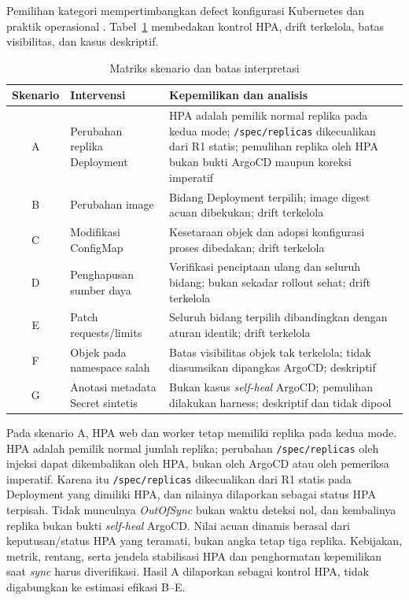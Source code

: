 Pemilihan kategori mempertimbangkan defect konfigurasi Kubernetes dan praktik operasional \citep{zhang2026configuration,pohjola2025mitigating}. Tabel~\ref{tab:matriks-eksperimen} membedakan kontrol HPA, drift terkelola, batas visibilitas, dan kasus deskriptif.

\begin{table}[H]
  \centering
  \small
  \caption{Matriks skenario dan batas interpretasi}
  \label{tab:matriks-eksperimen}
  \begin{tabularx}{\textwidth}{|c|>{\raggedright\arraybackslash}p{3.3cm}|X|}
    \hline
    Skenario & Intervensi & Kepemilikan dan analisis \\
    \hline
    A & Perubahan replika Deployment & HPA adalah pemilik normal replika pada kedua mode; \texttt{/spec/replicas} dikecualikan dari R1 statis; pemulihan replika oleh HPA bukan bukti ArgoCD maupun koreksi imperatif \\
    \hline
    B & Perubahan image & Bidang Deployment terpilih; image digest acuan dibekukan; drift terkelola \\
    \hline
    C & Modifikasi ConfigMap & Kesetaraan objek dan adopsi konfigurasi proses dibedakan; drift terkelola \\
    \hline
    D & Penghapusan sumber daya & Verifikasi penciptaan ulang dan seluruh bidang; bukan sekadar rollout sehat; drift terkelola \\
    \hline
    E & Patch requests/limits & Seluruh bidang terpilih dibandingkan dengan aturan identik; drift terkelola \\
    \hline
    F & Objek pada namespace salah & Batas visibilitas objek tak terkelola; tidak diasumsikan dipangkas ArgoCD; deskriptif \\
    \hline
    G & Anotasi metadata Secret sintetis & Bukan kasus \textit{self-heal} ArgoCD; pemulihan dilakukan harness; deskriptif dan tidak dipool \\
    \hline
  \end{tabularx}
\end{table}

Pada skenario A, HPA web dan worker tetap memiliki replika pada kedua mode. HPA adalah pemilik normal jumlah replika; perubahan \texttt{/spec/replicas} oleh injeksi dapat dikembalikan oleh HPA, bukan oleh ArgoCD atau oleh pemeriksa imperatif. Karena itu \texttt{/spec/replicas} dikecualikan dari R1 statis pada Deployment yang dimiliki HPA, dan nilainya dilaporkan sebagai status HPA terpisah. Tidak munculnya \textit{OutOfSync} bukan waktu deteksi nol, dan kembalinya replika bukan bukti \textit{self-heal} ArgoCD. Nilai acuan dinamis berasal dari keputusan/status HPA yang teramati, bukan angka tetap tiga replika. Kebijakan, metrik, rentang, serta jendela stabilisasi HPA dan penghormatan kepemilikan saat \textit{sync} harus diverifikasi. Hasil A dilaporkan sebagai kontrol HPA, tidak digabungkan ke estimasi efikasi B--E.

